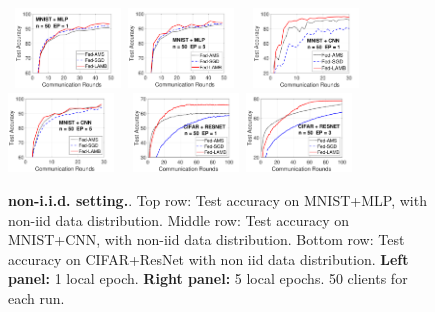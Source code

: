 \documentclass[twoside]{article}
\begin{document}
\begin{figure}[t!]
    \begin{center}
        \mbox{
        \includegraphics[width=0.25\textwidth]{new_figure/mnist_testerror_mlp_ep1_client50_iid0.pdf}
        \includegraphics[width=0.25\textwidth]{new_figure/mnist_testerror_mlp_ep5_client50_iid0.pdf}
        }
        \mbox{
        \includegraphics[width=0.25\textwidth]{new_figure/mnist_testerror_cnn_ep1_client50_iid0.pdf}
        \includegraphics[width=0.25\textwidth]{new_figure/mnist_testerror_cnn_ep5_client50_iid0.pdf}
        }
        \mbox{
                 \includegraphics[width=0.25\textwidth]{new_figure/cifar_testerror_resnet_ep1_client50_iid0.pdf}
        \includegraphics[width=0.25\textwidth]{new_figure/cifar_testerror_resnet_ep3_client50_iid0.pdf}        
        }
    \end{center}
	\caption{\textbf{non-i.i.d. setting.}. Top row: Test accuracy on MNIST+MLP, with non-iid data distribution. 
	{Middle row}: Test accuracy on MNIST+CNN, with non-iid data distribution. 
	{Bottom row:} Test accuracy on CIFAR+ResNet with non iid data distribution.
	\textbf{Left panel:} 1 local epoch. \textbf{Right panel:} 5 local epochs. 50 clients for each run.}
	\label{fig:noniid}
\end{figure}
\end{document}
